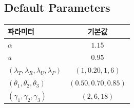 \documentclass[a4paper,11pt]{article}
\begin{document}
\subsection{Default Parameters}
\begin{center}
\begin{tabular}{lc}
\toprule
파라미터 & 기본값 \\
\midrule
$\alpha$ & $1.15$ \\
$\bar u$ & $0.95$ \\
$(\lambda_T,\lambda_R,\lambda_U,\lambda_P)$ & $(1,0.20,1,6)$ \\
$(\theta_1,\theta_2,\theta_3)$ & $(0.50,0.70,0.85)$ \\
$(\gamma_1,\gamma_2,\gamma_3)$ & $(2,6,18)$ \\
\bottomrule
\end{tabular}
\end{center}
\end{document}
